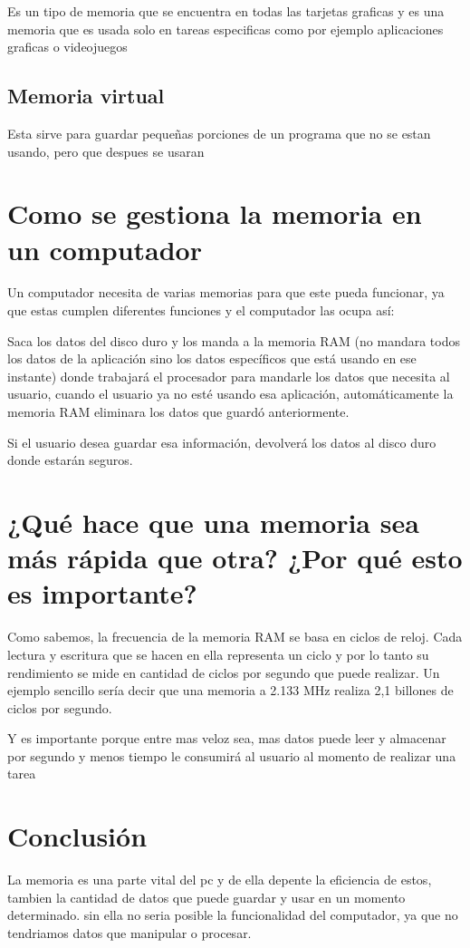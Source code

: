 \documentclass{article}
\begin{document}
Es un tipo de memoria que se encuentra en todas las tarjetas graficas y es una memoria que es usada solo en tareas especificas como por ejemplo aplicaciones graficas o videojuegos

\subsection{Memoria virtual}
Esta sirve para guardar pequeñas porciones de un programa que no se estan usando, pero que despues se usaran

\section{Como se gestiona la memoria en un computador} \label{Como se gestiona la memoria en un computador}

Un computador necesita de varias memorias para que este pueda funcionar, ya que estas cumplen diferentes funciones y el computador las ocupa así:
\vspace{0.5cm}

Saca los datos del disco duro y los manda a la memoria RAM (no mandara todos los datos de la aplicación sino los datos específicos que está usando en ese instante) donde trabajará el procesador para mandarle los datos que necesita al usuario, cuando el usuario ya no esté usando esa aplicación, automáticamente la memoria RAM eliminara los datos que guardó anteriormente.
\vspace{0.5cm}

Si el usuario desea guardar esa información, devolverá los datos al disco duro donde estarán seguros.


\section{¿Qué hace que una memoria sea más rápida que otra? ¿Por qué esto es importante?} \label{¿Qué hace que una memoria sea más rápida que otra? ¿Por qué esto es importante?}

Como sabemos, la frecuencia de la memoria RAM se basa en ciclos de reloj. Cada lectura y escritura que se hacen en ella representa un ciclo y por lo tanto su rendimiento se mide en cantidad de ciclos por segundo que puede realizar. Un ejemplo sencillo sería decir que una memoria a 2.133 MHz realiza 2,1 billones de ciclos por segundo.\cite{pagina3}
\vspace{0.5cm}

Y es importante porque entre mas veloz sea, mas datos puede leer y almacenar por segundo y menos tiempo le consumirá al usuario al momento de realizar una tarea

\section{Conclusión} \label{conclulsion}
La memoria es una parte vital del pc y de ella depente la eficiencia de estos, tambien la cantidad de datos que puede guardar y usar en un momento determinado. sin ella no seria posible la funcionalidad del computador, ya que no tendriamos datos que manipular o procesar.



\end{document}
